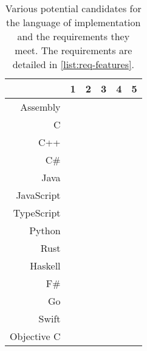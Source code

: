 \begin{table}[H] 
    \centering
    \begin{tabular}{r|ccccc}
        \toprule
        & 1 & 2 & 3 & 4 & 5 \\
        \midrule
        Assembly    & \y & \n & \y & \y & \y \\
        C           & \y & \y & \y & \y & \y \\
        C++         & \y & \y & \y & \y & \y \\
        C\#         & \y & \y & \n & \y & \y \\
        Java        & \y & \y & \n & \n & \n \\
        JavaScript  & \y & \n & \n & \n & \n \\
        TypeScript  & \y & \y & \n & \n & \n \\
        Python      & \y & \n & \n & \n & \n \\
        Rust        & \y & \y & \y & \y & \y \\
        Haskell     & \y & \y & \n & \y & \y \\
        F\#         & \y & \y & \n & \y & \y \\
        Go          & \y & \y & \n & \n & \y \\
        Swift       & \n & \y & \n & \y & \y \\
        Objective C & \n & \y & \y & \y & \y \\
        \bottomrule
    \end{tabular}
    \caption{Various potential candidates for the language of implementation and the requirements they meet. The requirements are detailed in \autoref{list:req-features}.}
    \label{tbl:lang-reqs}
\end{table}


